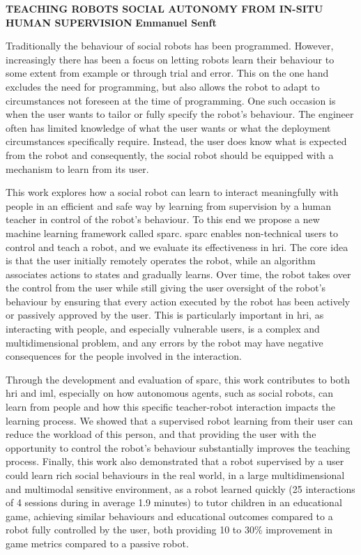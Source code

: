 \textbf{TEACHING ROBOTS SOCIAL AUTONOMY FROM IN-SITU HUMAN SUPERVISION}\newline
\textbf{Emmanuel Senft}

Traditionally the behaviour of social robots has been programmed. However, increasingly there has been a focus on letting robots learn their behaviour to some extent from example or through trial and error. This on the one hand excludes the need for programming, but also allows the robot to adapt to circumstances not foreseen at the time of programming. One such occasion is when the user wants to tailor or fully specify the robot’s behaviour. The engineer often has limited knowledge of what the user wants or what the deployment circumstances specifically require. Instead, the user does know what is expected from the robot and consequently, the social robot should be equipped with a mechanism to learn from its user.

This work explores how a social robot can learn to interact meaningfully with people in an efficient and safe way by learning from supervision by a human teacher in control of the robot's behaviour. To this end we propose a new machine learning framework called \gls{sparc}. \gls{sparc} enables non-technical users to control and teach a robot, and we evaluate its effectiveness in \gls{hri}. The core idea is that the user initially remotely operates the robot, while an algorithm associates actions to states and gradually learns. Over time, the robot takes over the control from the user while still giving the user oversight of the robot’s behaviour by ensuring that every action executed by the robot has been actively or passively approved by the user. This is particularly important in \gls{hri}, as interacting with people, and especially vulnerable users, is a complex and multidimensional problem, and any errors by the robot may have negative consequences for the people involved in the interaction. 

Through the development and evaluation of \gls{sparc}, this work contributes to both \gls{hri} and \acrlong{iml}, especially on how autonomous agents, such as social robots, can learn from people and how this specific teacher-robot interaction impacts the learning process. We showed that a supervised robot learning from their user can reduce the workload of this person, and that providing the user with the opportunity to control the robot's behaviour substantially improves the teaching process. Finally, this work also demonstrated that a robot supervised by a user could learn rich social behaviours in the real world, in a large multidimensional and multimodal sensitive environment, as a robot learned quickly (25 interactions of 4 sessions during in average 1.9 minutes) to tutor children in an educational game, achieving similar behaviours and educational outcomes compared to a robot fully controlled by the user, both providing 10 to 30\% improvement in game metrics compared to a passive robot. 